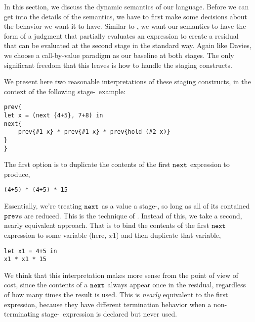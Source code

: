 In this section, we discuss the dynamic semantics of our language.  
Before we can get into the details of the semantics, we have to first make some decisions about the behavior we want it to have.  
Similar to \cite{davies96}, we want our semantics to have the form of a judgment that partially evaluates an expression to create a residual that can be evaluated at the second stage in the standard way.  Again like Davies, we choose a call-by-value paradigm as our baseline at both stages.  The only significant freedom that this leaves is how to handle the staging constructs.  

We present here two reasonable interpretations of these staging constructs, 
in the context of the following stage-\bbtwo~example:
\begin{lstlisting} 
prev{
let x = (next {4+5}, 7+8) in
next{
	prev{#1 x} * prev{#1 x} * prev{hold (#2 x)}
}
}
\end{lstlisting}
The first option is to duplicate the contents of the first ${\tt next}$ expression to produce,
\begin{lstlisting}
(4+5) * (4+5) * 15
\end{lstlisting}
Essentially, we're treating ${\tt next}$ as a value a stage-\bbone, so long as all of its contained ${\tt prev}$s are reduced.  
This is the technique of \cite{davies96}.
Instead of this, we take a second, nearly equivalent approach.  
That is to bind the contents of the first ${\tt next}$ expression to some variable (here, $x1$) and then duplicate that variable,
\begin{lstlisting} 
let x1 = 4+5 in
x1 * x1 * 15
\end{lstlisting}

We think that this interpretation makes more sense from the point of view of cost, 
since the contents of a ${\tt next}$ always appear once in the residual, regardless of how many times the result is used.  
This is {\em nearly} equivalent to the first expression, because they have different termination behavior 
when a non-terminating stage-\bbtwo~expression is declared but never used.

